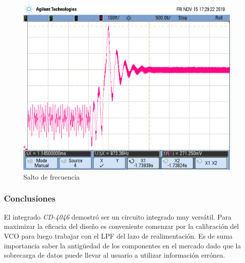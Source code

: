 \begin{figure}[H]
	\centering
	\includegraphics[scale=0.5]{ImagenesOsciloscopio/EscalonRCcompensado.png}
	\caption{Salto de frecuencia}
	\label{jump2}
\end{figure}


\subsubsection{Conclusiones}
El integrado \textit{CD-4046} demostró ser un circuito integrado muy versátil. Para maximizar la eficacia del diseño es conveniente comenzar por la calibración del VCO para luego trabajar con el LPF del lazo de realimentación. Es de suma importancia saber la antigüedad de los componentes en el mercado dado que la sobrecarga de datos puede llevar al usuario a utilizar información errónea. 



%

